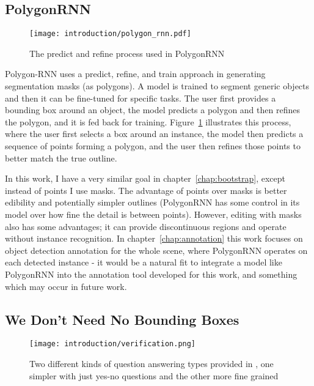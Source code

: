 \subsection {PolygonRNN \cite{Castrejon2017}}

\begin{figure}[h]
  \centering
  \texttt{[image: introduction/polygon\_rnn.pdf]}
  \caption{The predict and refine process used in PolygonRNN \cite{Castrejon2017}}  
  \label{fig:polygon_rnn}
\end{figure}


Polygon-RNN \cite{Castrejon2017} uses a predict, refine, and train approach in generating segmentation masks (as polygons). A model is trained to segment generic objects and then it can be fine-tuned for specific tasks. The user first provides a bounding box around an object, the model predicts a polygon and then refines the polygon, and it is fed back for training. Figure~\ref{fig:polygon_rnn} illustrates this process, where the user first selects a box around an instance, the model then predicts a sequence of points forming a polygon, and the user then refines those points to better match the true outline.

In this work, I have a very similar goal in chapter~\ref{chap:bootstrap}, except instead of points I use masks. The advantage of points over masks is better edibility and potentially simpler outlines (PolygonRNN has some control in its model over how fine the detail is between points). However, editing with masks also has some advantages; it can provide discontinuous regions and operate without instance recognition. In chapter~\ref{chap:annotation} this work focuses on object detection annotation for the whole scene, where PolygonRNN operates on each detected instance - it would be a natural fit to integrate a model like PolygonRNN into the annotation tool developed for this work, and something which may occur in future work.


\subsection {We Don't Need No Bounding Boxes}

\begin{figure}[h]
  \centering
  \texttt{[image: introduction/verification.png]}
  \caption{Two different kinds of question answering types provided in \cite{Papadopoulos2016}, one simpler with just yes-no questions and the other more fine grained}
  \label{fig:verification}
\end{figure}

